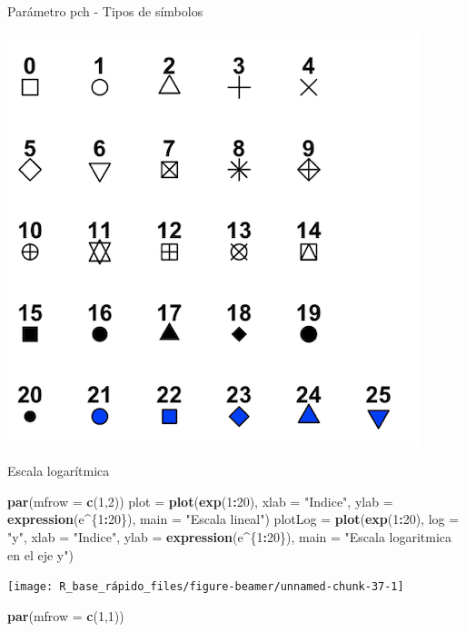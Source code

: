 \documentclass[
  ignorenonframetext,
  aspectratio=169]{beamer}
\newenvironment{Shaded}{\begin{snugshade}}{\end{snugshade}}
\newcommand{\AttributeTok}[1]{\textcolor[rgb]{0.13,0.29,0.53}{#1}}
\newcommand{\DecValTok}[1]{\textcolor[rgb]{0.00,0.00,0.81}{#1}}
\newcommand{\FunctionTok}[1]{\textcolor[rgb]{0.13,0.29,0.53}{\textbf{#1}}}
\newcommand{\NormalTok}[1]{#1}
\newcommand{\OtherTok}[1]{\textcolor[rgb]{0.56,0.35,0.01}{#1}}
\newcommand{\SpecialCharTok}[1]{\textcolor[rgb]{0.81,0.36,0.00}{\textbf{#1}}}
\newcommand{\StringTok}[1]{\textcolor[rgb]{0.31,0.60,0.02}{#1}}
\begin{document}
\begin{frame}{Parámetro pch - Tipos de símbolos}
\label{paruxe1metro-pch---tipos-de-suxedmbolos}
\begin{center}\includegraphics[width=0.45\linewidth]{Imgs/pch} \end{center}
\end{frame}

\begin{frame}[fragile]{Escala logarítmica}
\label{escala-logaruxedtmica}
\begin{Shaded}
\begin{Highlighting}[]
\FunctionTok{par}\NormalTok{(}\AttributeTok{mfrow =} \FunctionTok{c}\NormalTok{(}\DecValTok{1}\NormalTok{,}\DecValTok{2}\NormalTok{))}
\NormalTok{plot }\OtherTok{=} \FunctionTok{plot}\NormalTok{(}\FunctionTok{exp}\NormalTok{(}\DecValTok{1}\SpecialCharTok{:}\DecValTok{20}\NormalTok{), }\AttributeTok{xlab =} \StringTok{"Indice"}\NormalTok{,}
            \AttributeTok{ylab =} \FunctionTok{expression}\NormalTok{(e}\SpecialCharTok{\^{}}\NormalTok{\{}\DecValTok{1}\SpecialCharTok{:}\DecValTok{20}\NormalTok{\}), }
            \AttributeTok{main =} \StringTok{"Escala lineal"}\NormalTok{)}
\NormalTok{plotLog }\OtherTok{=} \FunctionTok{plot}\NormalTok{(}\FunctionTok{exp}\NormalTok{(}\DecValTok{1}\SpecialCharTok{:}\DecValTok{20}\NormalTok{), }\AttributeTok{log =} \StringTok{"y"}\NormalTok{, }\AttributeTok{xlab =} \StringTok{"Indice"}\NormalTok{, }
               \AttributeTok{ylab =} \FunctionTok{expression}\NormalTok{(e}\SpecialCharTok{\^{}}\NormalTok{\{}\DecValTok{1}\SpecialCharTok{:}\DecValTok{20}\NormalTok{\}), }
               \AttributeTok{main =} \StringTok{"Escala logaritmica en el eje y"}\NormalTok{)}
\end{Highlighting}
\end{Shaded}

\begin{center}\texttt{[image: R\_base\_rápido\_files/figure-beamer/unnamed-chunk-37-1]} \end{center}

\begin{Shaded}
\begin{Highlighting}[]
\FunctionTok{par}\NormalTok{(}\AttributeTok{mfrow =} \FunctionTok{c}\NormalTok{(}\DecValTok{1}\NormalTok{,}\DecValTok{1}\NormalTok{))}
\end{Highlighting}
\end{Shaded}
\end{frame}
\end{document}
